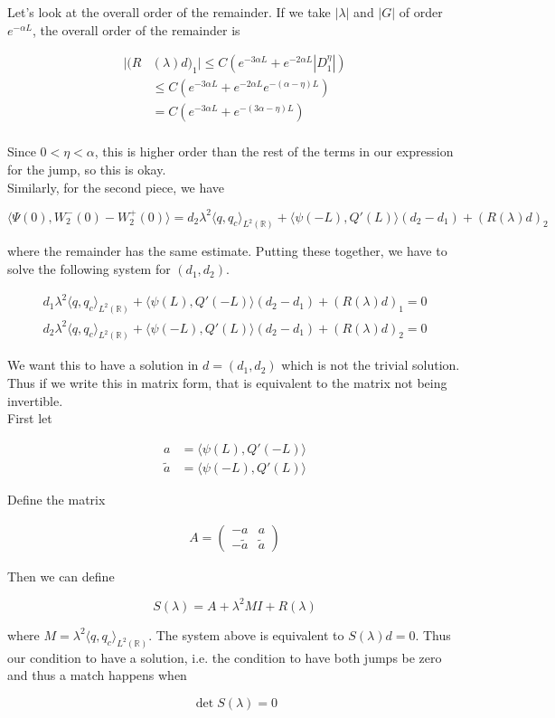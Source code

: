 \documentclass[12pt]{article}
\def\R{{\mathbb R}}
\begin{document}
Let's look at the overall order of the remainder. If we take $|\lambda|$ and $|G|$ of order $e^{-\alpha L}$, the overall order of the remainder is

\begin{align*}
|(R&(\lambda)d)_1| \leq C ( e^{-3 \alpha L} + e^{-2 \alpha L} |D_1^{\eta}| ) \\
&\leq C ( e^{-3 \alpha L} + e^{-2 \alpha L} e^{-(\alpha - \eta)L}) \\
&= C ( e^{-3 \alpha L} + e^{-(3 \alpha - \eta) L} )\\
\end{align*}

Since $0 < \eta < \alpha$, this is higher order than the rest of the terms in our expression for the jump, so this is okay.\\

Similarly, for the second piece, we have

\[
\langle \Psi(0), W_2^-(0) - W_2^+(0) \rangle = 
d_2 \lambda^2 \langle q, q_c \rangle_{L^2(\R)} + \langle \psi(-L), Q'(L) \rangle(d_2 - d_1) + (R(\lambda)d)_2
\]

where the remainder has the same estimate. Putting these together, we have to solve the following system for $(d_1, d_2)$.

\begin{align*}
d_1 \lambda^2 \langle q, q_c \rangle_{L^2(\R)} + \langle \psi(L), Q'(-L) \rangle(d_2 - d_1) + (R(\lambda)d)_1 = 0\\
d_2 \lambda^2 \langle q, q_c \rangle_{L^2(\R)} + \langle \psi(-L), Q'(L) \rangle(d_2 - d_1) + (R(\lambda)d)_2 = 0
\end{align*}

We want this to have a solution in $d = (d_1, d_2)$ which is not the trivial solution. Thus if we write this in matrix form, that is equivalent to the matrix not being invertible.\\

First let

\begin{align*}
a &= \langle \psi(L), Q'(-L) \rangle \\
\tilde{a} &=\langle \psi(-L), Q'(L) \rangle
\end{align*}

Define the matrix

\begin{align*}
A = \begin{pmatrix}
-a & a \\ -\tilde{a} & \tilde{a} 
\end{pmatrix}
\end{align*}

Then we can define

\[
S(\lambda) = A + \lambda^2 MI + R(\lambda) 
\]

where $M = \lambda^2 \langle q, q_c \rangle_{L^2(\R)}$. The system above is equivalent to $S(\lambda)d = 0$. Thus our condition to have a solution, i.e. the condition to have both jumps be zero and thus a match happens when

\[
\det S(\lambda) = 0
\]
\end{document}
